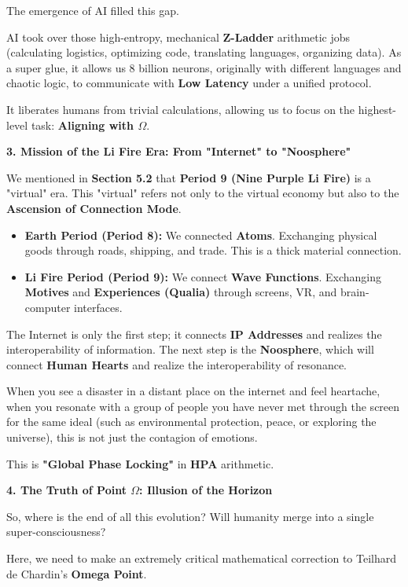 The emergence of AI filled this gap.

AI took over those high-entropy, mechanical \textbf{Z-Ladder} arithmetic jobs (calculating logistics, optimizing code, translating languages, organizing data). As a super glue, it allows us 8 billion neurons, originally with different languages and chaotic logic, to communicate with \textbf{Low Latency} under a unified protocol.

It liberates humans from trivial calculations, allowing us to focus on the highest-level task: \textbf{Aligning with $\Omega$}.

\textbf{3. Mission of the Li Fire Era: From "Internet" to "Noosphere"}

We mentioned in \textbf{Section 5.2} that \textbf{Period 9 (Nine Purple Li Fire)} is a "virtual" era. This "virtual" refers not only to the virtual economy but also to the \textbf{Ascension of Connection Mode}.

\begin{itemize}
\item \textbf{Earth Period (Period 8):} We connected \textbf{Atoms}. Exchanging physical goods through roads, shipping, and trade. This is a thick material connection.
\item \textbf{Li Fire Period (Period 9):} We connect \textbf{Wave Functions}. Exchanging \textbf{Motives} and \textbf{Experiences (Qualia)} through screens, VR, and brain-computer interfaces.
\end{itemize}

The Internet is only the first step; it connects \textbf{IP Addresses} and realizes the interoperability of information.
The next step is the \textbf{Noosphere}, which will connect \textbf{Human Hearts} and realize the interoperability of resonance.

When you see a disaster in a distant place on the internet and feel heartache, when you resonate with a group of people you have never met through the screen for the same ideal (such as environmental protection, peace, or exploring the universe), this is not just the contagion of emotions.

This is \textbf{"Global Phase Locking"} in \textbf{HPA} arithmetic.

\textbf{4. The Truth of Point $\Omega$: Illusion of the Horizon}

So, where is the end of all this evolution? Will humanity merge into a single super-consciousness?

Here, we need to make an extremely critical mathematical correction to Teilhard de Chardin's \textbf{Omega Point}.

